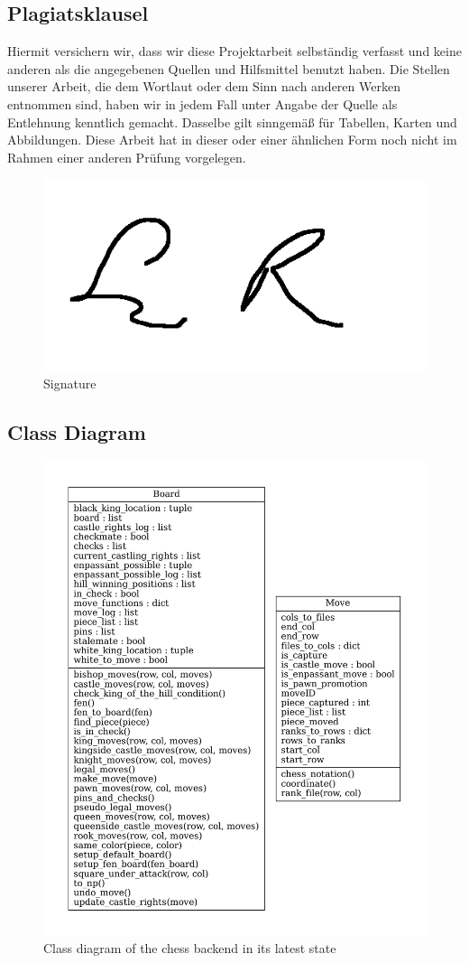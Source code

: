 \subsection*{Plagiatsklausel}

Hiermit versichern wir, dass wir diese Projektarbeit selbständig verfasst und keine
anderen als die angegebenen Quellen und Hilfsmittel benutzt haben. Die Stellen
unserer Arbeit, die dem Wortlaut oder dem Sinn nach anderen Werken entnommen
sind, haben wir in jedem Fall unter Angabe der Quelle als Entlehnung kenntlich
gemacht. Dasselbe gilt sinngemäß für Tabellen, Karten und Abbildungen. Diese Arbeit
hat in dieser oder einer ähnlichen Form noch nicht im Rahmen einer anderen Prüfung
vorgelegen.

\begin{figure}[hbtp]
	\centering
	\includegraphics[width=.5\linewidth, page=1]{reference/signature/l_sign.png}
	\caption{Signature}
\end{figure}

\pagebreak

\subsection*{Class Diagram}

\begin{figure}[hbtp]
	\centering
	\includegraphics[width=0.7\linewidth, page=1]{reference/pics/class-diagram.pdf}
	\caption{Class diagram of the chess backend in its latest state}
  \label{fig:class-diagram}
\end{figure}

